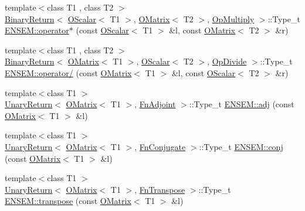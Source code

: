 \begin{DoxyCompactItemize}
\item 
{\footnotesize template$<$class T1 , class T2 $>$ }\\\mbox{\hyperlink{structENSEM_1_1BinaryReturn}{Binary\+Return}}$<$ \mbox{\hyperlink{classENSEM_1_1OScalar}{O\+Scalar}}$<$ T1 $>$, \mbox{\hyperlink{classENSEM_1_1OMatrix}{O\+Matrix}}$<$ T2 $>$, \mbox{\hyperlink{structENSEM_1_1OpMultiply}{Op\+Multiply}} $>$\+::Type\+\_\+t \mbox{\hyperlink{group__obsmatrix_ga92a06278aeac18e092853d6c4cf37b0b}{E\+N\+S\+E\+M\+::operator$\ast$}} (const \mbox{\hyperlink{classENSEM_1_1OScalar}{O\+Scalar}}$<$ T1 $>$ \&l, const \mbox{\hyperlink{classENSEM_1_1OMatrix}{O\+Matrix}}$<$ T2 $>$ \&r)
\item 
{\footnotesize template$<$class T1 , class T2 $>$ }\\\mbox{\hyperlink{structENSEM_1_1BinaryReturn}{Binary\+Return}}$<$ \mbox{\hyperlink{classENSEM_1_1OMatrix}{O\+Matrix}}$<$ T1 $>$, \mbox{\hyperlink{classENSEM_1_1OScalar}{O\+Scalar}}$<$ T2 $>$, \mbox{\hyperlink{structENSEM_1_1OpDivide}{Op\+Divide}} $>$\+::Type\+\_\+t \mbox{\hyperlink{group__obsmatrix_gaa90c91fdbe2814bb15f1ac76012585d8}{E\+N\+S\+E\+M\+::operator/}} (const \mbox{\hyperlink{classENSEM_1_1OMatrix}{O\+Matrix}}$<$ T1 $>$ \&l, const \mbox{\hyperlink{classENSEM_1_1OScalar}{O\+Scalar}}$<$ T2 $>$ \&r)
\item 
{\footnotesize template$<$class T1 $>$ }\\\mbox{\hyperlink{structENSEM_1_1UnaryReturn}{Unary\+Return}}$<$ \mbox{\hyperlink{classENSEM_1_1OMatrix}{O\+Matrix}}$<$ T1 $>$, \mbox{\hyperlink{structENSEM_1_1FnAdjoint}{Fn\+Adjoint}} $>$\+::Type\+\_\+t \mbox{\hyperlink{group__obsmatrix_gab99c32b7f3eabbe8b6a6ec2834914c88}{E\+N\+S\+E\+M\+::adj}} (const \mbox{\hyperlink{classENSEM_1_1OMatrix}{O\+Matrix}}$<$ T1 $>$ \&l)
\item 
{\footnotesize template$<$class T1 $>$ }\\\mbox{\hyperlink{structENSEM_1_1UnaryReturn}{Unary\+Return}}$<$ \mbox{\hyperlink{classENSEM_1_1OMatrix}{O\+Matrix}}$<$ T1 $>$, \mbox{\hyperlink{structENSEM_1_1FnConjugate}{Fn\+Conjugate}} $>$\+::Type\+\_\+t \mbox{\hyperlink{group__obsmatrix_gaa0e14166cccccfb643584dfa83138cb2}{E\+N\+S\+E\+M\+::conj}} (const \mbox{\hyperlink{classENSEM_1_1OMatrix}{O\+Matrix}}$<$ T1 $>$ \&l)
\item 
{\footnotesize template$<$class T1 $>$ }\\\mbox{\hyperlink{structENSEM_1_1UnaryReturn}{Unary\+Return}}$<$ \mbox{\hyperlink{classENSEM_1_1OMatrix}{O\+Matrix}}$<$ T1 $>$, \mbox{\hyperlink{structENSEM_1_1FnTranspose}{Fn\+Transpose}} $>$\+::Type\+\_\+t \mbox{\hyperlink{group__obsmatrix_gae3097e7f8ff8914a37a874367aed476b}{E\+N\+S\+E\+M\+::transpose}} (const \mbox{\hyperlink{classENSEM_1_1OMatrix}{O\+Matrix}}$<$ T1 $>$ \&l)

\end{DoxyCompactItemize}
